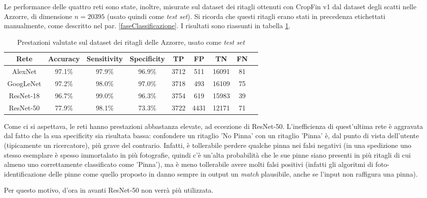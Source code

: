 Le performance delle quattro reti sono state, inoltre, misurate sul dataset dei ritagli ottenuti con CropFin v1 dal dataset degli scatti nelle Azzorre, di dimensione $n=20395$ (usato quindi come \textit{test set}). Si ricorda che questi ritagli erano stati in precedenza etichettati manualmente, come descritto nel par. \ref{faseClassificazione}. I risultati sono riassunti in tabella \ref{prestazioniRetiAzzorre}.

\begin{table}[h]

  \centering
  \begin{adjustbox}{width=1\textwidth}
  \begin{tabular}{c c c c c c c c c}
  \hline
  Rete&Accuracy&Sensitivity&Specificity&TP&FP&TN&FN\\
  \hline
  AlexNet&97.1\%&97.9\%&96.9\%&3712&511&16091&81\\
  GoogLeNet&97.2\%&98.0\%&97.0\%&3718&493&16109&75\\
  ResNet-18&96.7\%&99.0\%&96.3\%&3754&619&15983&39\\
  ResNet-50&77.9\%&98.1\%&73.3\%&3722&4431&12171&71\\
  \hline
  \end{tabular}
  \end{adjustbox}
  
  \caption{Prestazioni valutate sul dataset dei ritagli delle Azzorre, usato come \textit{test set}}
  \label{prestazioniRetiAzzorre}

\end{table}

Come ci si aspettava, le reti hanno prestazioni abbastanza elevate, ad eccezione di ResNet-50. L'inefficienza di quest'ultima rete è aggravata dal fatto che la sua specificity sia risultata bassa: confondere un ritaglio 'No Pinna' con un ritaglio 'Pinna' è, dal punto di vista dell'utente (tipicamente un ricercatore), più grave del contrario. Infatti, è tollerabile perdere qualche pinna nei falsi negativi (in una spedizione uno stesso esemplare è spesso immortalato in più fotografie, quindi c'è un'alta probabilità che le sue pinne siano presenti in più ritagli di cui almeno uno correttamente classificato come 'Pinna'), ma è meno tollerabile avere molti falsi positivi (infatti gli algoritmi di foto-identificazione delle pinne come quello proposto in \cite{emanuele} danno sempre in output un \textit{match} plausibile, anche se l'input non raffigura una pinna).

Per questo motivo, d'ora in avanti ResNet-50 non verrà più utilizzata.

